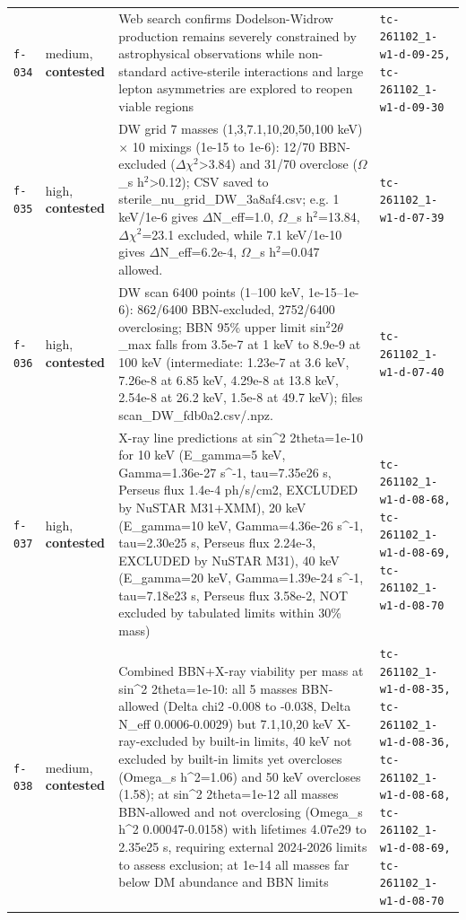 \documentclass[11pt,a4paper]{article}
\begin{document}
\begin{longtable}{@{}p{}p{}p{}p{}@{}}
\texttt{f-034} & medium, \textbf{contested} & Web search confirms Dodelson-Widrow production remains severely constrained by astrophysical observations while non-standard active-sterile interactions and large lepton asymmetries are explored to reopen viable regions & \texttt{tc-261102\_\allowbreak{}1-w1-d-09-25,\allowbreak{} tc-261102\_\allowbreak{}1-w1-d-09-30} \\
\texttt{f-035} & high, \textbf{contested} & DW grid 7 masses (1,3,7.1,10,20,50,100 keV) $\times$ 10 mixings (1e-15 to 1e-6): 12/70 BBN-excluded ($\Delta$$\chi$$^2$\textgreater{}3.84) and 31/70 overclose ($\Omega$\_s h$^2$\textgreater{}0.12); CSV saved to sterile\_nu\_grid\_DW\_3a8af4.csv; e.g. 1 keV/1e-6 gives $\Delta$N\_eff=1.0, $\Omega$\_s h$^2$=13.84, $\Delta$$\chi$$^2$=23.1 excluded, while 7.1 keV/1e-10 gives $\Delta$N\_eff=6.2e-4, $\Omega$\_s h$^2$=0.047 allowed. & \texttt{tc-261102\_\allowbreak{}1-w1-d-07-39} \\
\texttt{f-036} & high, \textbf{contested} & DW scan 6400 points (1--100 keV, 1e-15--1e-6): 862/6400 BBN-excluded, 2752/6400 overclosing; BBN 95\% upper limit sin$^2$2$\theta$\_max falls from 3.5e-7 at 1 keV to 8.9e-9 at 100 keV (intermediate: 1.23e-7 at 3.6 keV, 7.26e-8 at 6.85 keV, 4.29e-8 at 13.8 keV, 2.54e-8 at 26.2 keV, 1.5e-8 at 49.7 keV); files scan\_DW\_fdb0a2.csv/.npz. & \texttt{tc-261102\_\allowbreak{}1-w1-d-07-40} \\
\texttt{f-037} & high, \textbf{contested} & X-ray line predictions at sin\textasciicircum{}2 2theta=1e-10 for 10 keV (E\_gamma=5 keV, Gamma=1.36e-27 s\textasciicircum{}-1, tau=7.35e26 s, Perseus flux 1.4e-4 ph/s/cm2, EXCLUDED by NuSTAR M31+XMM), 20 keV (E\_gamma=10 keV, Gamma=4.36e-26 s\textasciicircum{}-1, tau=2.30e25 s, Perseus flux 2.24e-3, EXCLUDED by NuSTAR M31), 40 keV (E\_gamma=20 keV, Gamma=1.39e-24 s\textasciicircum{}-1, tau=7.18e23 s, Perseus flux 3.58e-2, NOT excluded by tabulated limits within 30\% mass) & \texttt{tc-261102\_\allowbreak{}1-w1-d-08-68,\allowbreak{} tc-261102\_\allowbreak{}1-w1-d-08-69,\allowbreak{} tc-261102\_\allowbreak{}1-w1-d-08-70} \\
\texttt{f-038} & medium, \textbf{contested} & Combined BBN+X-ray viability per mass at sin\textasciicircum{}2 2theta=1e-10: all 5 masses BBN-allowed (Delta chi2 -0.008 to -0.038, Delta N\_eff 0.0006-0.0029) but 7.1,10,20 keV X-ray-excluded by built-in limits, 40 keV not excluded by built-in limits yet overcloses (Omega\_s h\textasciicircum{}2=1.06) and 50 keV overcloses (1.58); at sin\textasciicircum{}2 2theta=1e-12 all masses BBN-allowed and not overclosing (Omega\_s h\textasciicircum{}2 0.00047-0.0158) with lifetimes 4.07e29 to 2.35e25 s, requiring external 2024-2026 limits to assess exclusion; at 1e-14 all masses far below DM abundance and BBN limits & \texttt{tc-261102\_\allowbreak{}1-w1-d-08-35,\allowbreak{} tc-261102\_\allowbreak{}1-w1-d-08-36,\allowbreak{} tc-261102\_\allowbreak{}1-w1-d-08-68,\allowbreak{} tc-261102\_\allowbreak{}1-w1-d-08-69,\allowbreak{} tc-261102\_\allowbreak{}1-w1-d-08-70} \\

\end{longtable}
\end{document}
